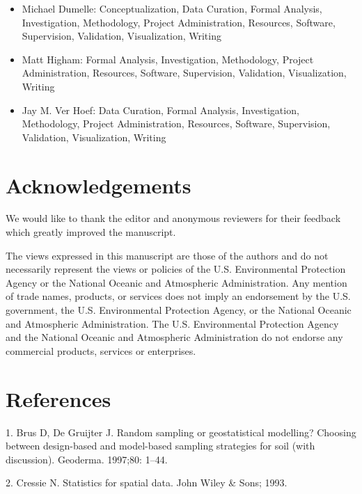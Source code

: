 \documentclass[10pt,letterpaper]{article}
\begin{document}
\begin{itemize}
\item
  Michael Dumelle: Conceptualization, Data Curation, Formal Analysis,
  Investigation, Methodology, Project Administration, Resources,
  Software, Supervision, Validation, Visualization, Writing
\item
  Matt Higham: Formal Analysis, Investigation, Methodology, Project
  Administration, Resources, Software, Supervision, Validation,
  Visualization, Writing
\item
  Jay M. Ver Hoef: Data Curation, Formal Analysis, Investigation,
  Methodology, Project Administration, Resources, Software, Supervision,
  Validation, Visualization, Writing
\end{itemize}

\hypertarget{acknowledgements}{%
\section*{Acknowledgements}\label{acknowledgements}}

We would like to thank the editor and anonymous reviewers for their
feedback which greatly improved the manuscript.

The views expressed in this manuscript are those of the authors and do
not necessarily represent the views or policies of the U.S.
Environmental Protection Agency or the National Oceanic and Atmospheric
Administration. Any mention of trade names, products, or services does
not imply an endorsement by the U.S. government, the U.S. Environmental
Protection Agency, or the National Oceanic and Atmospheric
Administration. The U.S. Environmental Protection Agency and the
National Oceanic and Atmospheric Administration do not endorse any
commercial products, services or enterprises.

\hypertarget{references}{%
\section*{References}\label{references}}

\hypertarget{refs}{}
\leavevmode\hypertarget{ref-brus1997random}{}%
1. Brus D, De Gruijter J. Random sampling or geostatistical modelling?
Choosing between design-based and model-based sampling strategies for
soil (with discussion). Geoderma. 1997;80: 1--44.

\leavevmode\hypertarget{ref-cressie1993statistics}{}%
2. Cressie N. Statistics for spatial data. John Wiley \& Sons; 1993.
\end{document}
